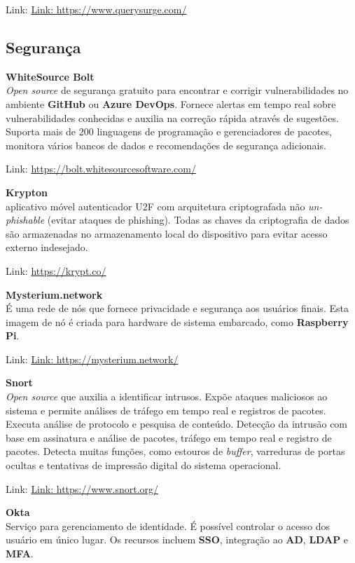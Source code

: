 \documentclass[fleqn,10pt]{../sty/SelfArx} %
\begin{document}
Link: \url{Link: https://www.querysurge.com/}

\subsection*{Segurança}

\textbf{WhiteSource Bolt} \\
\textit{Open source} de segurança gratuito para encontrar e corrigir vulnerabilidades no ambiente \textbf{GitHub} ou \textbf{Azure DevOps}. Fornece alertas em tempo real sobre vulnerabilidades conhecidas e auxilia na correção rápida através de sugestões. Suporta mais de 200 linguagens de programação e gerenciadores de pacotes, monitora vários bancos de dados e recomendações de segurança adicionais.

Link: \url{https://bolt.whitesourcesoftware.com/}

\textbf{Krypton} \\
aplicativo móvel autenticador U2F com arquitetura criptografada não \textit{un-phishable} (evitar ataques de phishing). Todas as chaves da criptografia de dados são armazenadas no armazenamento local do dispositivo para evitar acesso externo indesejado.

Link: \url{https://krypt.co/}

\textbf{Mysterium.network} \\
É uma rede de nós que fornece privacidade e segurança aos usuários finais. Esta imagem de nó é criada para hardware de sistema embarcado, como \textbf{Raspberry Pi}.

Link: \url{Link: https://mysterium.network/}

\textbf{Snort} \\
\textit{Open source} que auxilia a identificar intrusos. Expõe ataques maliciosos ao sistema e permite análises de tráfego em tempo real e registros de pacotes. Executa análise de protocolo e pesquisa de conteúdo. Detecção da intrusão com base em assinatura e análise de pacotes, tráfego em tempo real e registro de pacotes. Detecta muitas funções, como estouros de \textit{buffer}, varreduras de portas ocultas e tentativas de impressão digital do sistema operacional.

Link: \url{Link: https://www.snort.org/}

\textbf{Okta} \\
Serviço para gerenciamento de identidade. É possível controlar o acesso dos usuário em único lugar. Os recursos incluem \textbf{SSO}, integração ao \textbf{AD}, \textbf{LDAP} e \textbf{MFA}.
\end{document}
